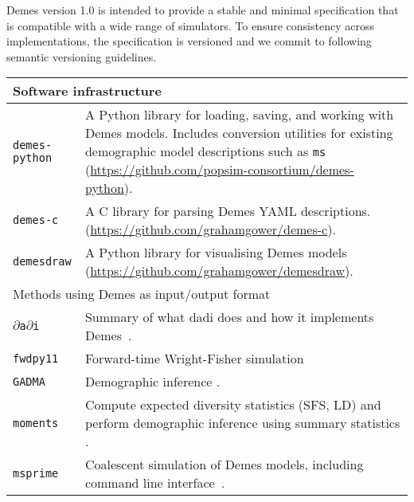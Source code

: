 \documentclass[11pt]{article}
\newcommand{\msprime}[0]{\texttt{msprime}}
\newcommand{\moments}[0]{\texttt{moments}}
\newcommand{\dadi}[0]{\texttt{$\partial$a$\partial$i}}
\newcommand{\fwdpy}[0]{\texttt{fwdpy11}}
\newcommand{\gadma}[0]{\texttt{GADMA}}
\begin{document}
Demes version 1.0 is intended to provide a stable and minimal specification
that is compatible with a wide range of simulators. To ensure consistency
across implementations, the specification is versioned and we commit to
following semantic versioning guidelines.

\renewcommand{\arraystretch}{1.5}
\begin{table}
\begin{center}
\begin{tabular}{lp{12cm}}
\toprule
\multicolumn{2}{l}{Software infrastructure}\\
\midrule
\texttt{demes-python} &
    A Python library for loading, saving, and working with
    Demes models. Includes conversion utilities for existing
    demographic model descriptions such as
    \texttt{ms}~\citep{hudson2002generating}
    (\url{https://github.com/popsim-consortium/demes-python}).\\

\texttt{demes-c} &
    A C library for parsing Demes YAML descriptions.
    (\url{https://github.com/grahamgower/demes-c}). \\

\texttt{demesdraw} &
    A Python library for visualising Demes models
    (\url{https://github.com/grahamgower/demesdraw}). \\

\midrule
\multicolumn{2}{l}{Methods using Demes as input/output format}\\
\midrule


\dadi &
    Summary of what dadi does and how it implements Demes~\citep{gutenkunst2009inferring}.
    \\

\fwdpy &
    Forward-time Wright-Fisher simulation \citep{thornton2014cpp}\\

\gadma &
    Demographic inference \citep{noskova2020gadma}.\\

\moments &
    Compute expected diversity statistics (SFS, LD) and perform
    demographic inference using summary statistics
    \citep{jouganous2017inferring,ragsdale2019models}.\\

\msprime &
    Coalescent simulation of Demes models, including command line
    interface~\citep{kelleher2016efficient,kelleher2020coalescent}.\\


\end{tabular}
\end{center}
\end{table}
\end{document}

